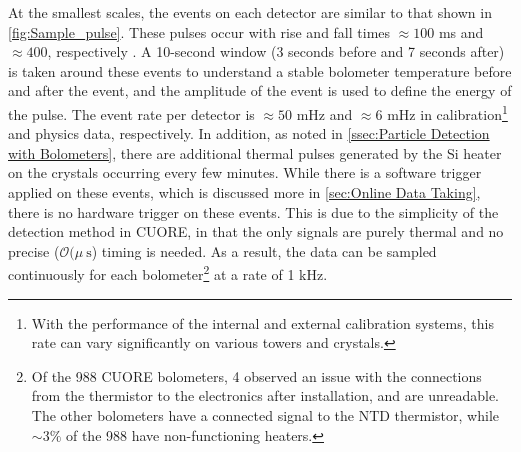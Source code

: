 At the smallest scales, the events on each detector are similar to that shown in \autoref{fig:Sample_pulse}.
These pulses occur with rise and fall times $\approx100$ ms and $\approx400$, respectively \cite{Alduino:2017ehq}.
A 10-second window (3 seconds before and 7 seconds after) is taken around these events to understand a stable bolometer temperature before and after the event, and the amplitude of the event is used to define the energy of the pulse.
The event rate per detector is $\approx 50$ mHz and $\approx6$ mHz in calibration\footnote{With the performance of the internal and external calibration systems, this rate can vary significantly on various towers and crystals.} and physics data, respectively.
In addition, as noted in \autoref{ssec:Particle Detection with Bolometers}, there are additional thermal pulses generated by the Si heater on the crystals occurring every few minutes.
While there is a software trigger applied on these events, which is discussed more in \autoref{sec:Online Data Taking}, there is no hardware trigger on these events.
This is due to the simplicity of the detection method in CUORE, in that the only signals are purely thermal and no precise ($\mathcal{O}(\mu~\textrm{s}$) timing is needed.
As a result, the data can be sampled continuously for each bolometer\footnote{Of the 988 CUORE bolometers, 4 observed an issue with the connections from the thermistor to the electronics after installation, and are unreadable.
The other bolometers have a connected signal to the NTD thermistor, while $\sim3\%$ of the 988 have non-functioning heaters.} at a rate of 1 kHz.

